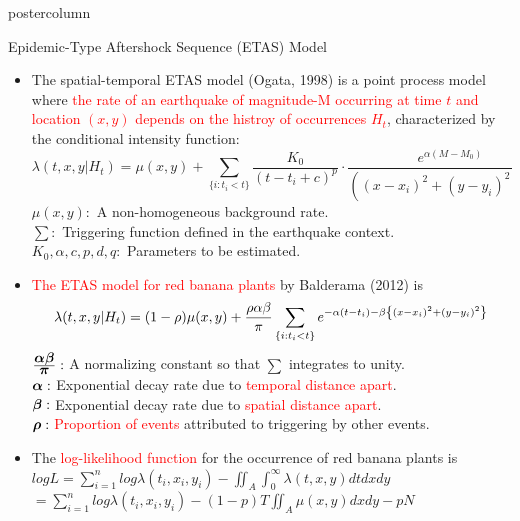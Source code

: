 \documentclass[final]{beamer}\usepackage[]{graphicx}\usepackage[]{color}
\newcommand{\bpi}{\mbox{\boldmath $\pi$} }
\newcommand{\balpha}{\mbox{\boldmath $\alpha$} }
\newcommand{\bbeta}{\mbox{\boldmath $\beta$} }
\newcommand{\brho}{\mbox{\boldmath $\rho$} }
\let\originalleft\left
\let\originalright\right
\renewcommand{\left}{\mathopen{}\mathclose\bgroup\originalleft}
\renewcommand{\right}{\aftergroup\egroup\originalright}
\newcommand{\red}{\textcolor{red}}
\begin{document}
{\begin{frame}
\begin{columns}
\begin{column}{.33\textwidth}
\begin{beamercolorbox}[center,wd=\textwidth]{postercolumn}
\begin{minipage}[T]{.97\textwidth}
{\begin{block}{Epidemic-Type Aftershock Sequence (ETAS) Model}
\begin{itemize}
	\item The spatial-temporal ETAS model (Ogata, 1998) is a point process model where \red{the rate of an earthquake of magnitude-M occurring at time $t$ and location $(x,y)$ depends on the histroy of occurrences $H_t$}, characterized by	the conditional intensity function:
	      $$\lambda(t,x,y|H_t)=\mu(x,y)+\sum \limits_{\{i:t_i<t\}}\frac{K_0}{(t-t_i+c)^p} \cdot  \frac{e^{\alpha(M-M_0)}}{((x-x_i)^2+(y-y_i)^2+d)^q}$$
	      $\mu(x, y):$ A non-homogeneous background rate.\\
	      $\sum:$ Triggering function defined in the earthquake context.\\
	      $K_0,\alpha, c, p, d, q:$ Parameters to be estimated.
	\vspace{0.5cm}
  \item \red{The ETAS model for red banana plants} by Balderama (2012) is
        $$\displaystyle{\lambda(t,x,y|H_t)=(1-\rho)\mu(x,y)+\frac{\rho\alpha\beta}{\pi}\sum \limits_{\left\{i:t_i<t\right\}}e^{-\alpha(t-t_i)-\beta\left\{(x-x_i)^2+(y-y_i)^2\right\}}}$$
        $\frac{\balpha\bbeta}{\bpi}:$ A normalizing constant so that $\sum$ integrates to unity.\\
        $\balpha:$ Exponential decay rate due to \red{temporal distance apart}.\\
        $\bbeta:$ Exponential decay rate due to \red{spatial distance apart}.\\
        $\brho:$ \red{Proportion of events} attributed to triggering by other events.
  \vspace{0.4cm}
  \item The \red{log-likelihood function} for the occurrence of red banana plants is \\
   \hspace{1cm} $\displaystyle{logL=\sum \limits_{i=1}^{n}log\lambda(t_i,x_i,y_i)-\iint_A \int_0^\infty \lambda(t,x,y)dtdxdy}$  \\
   \hspace{3.1cm} $\displaystyle{=\sum \limits_{i=1}^{n}log\lambda(t_i,x_i,y_i)-(1-p)T\iint_A\mu(x,y)dxdy-pN}$
   
   
\end{itemize}
  


\end{block}
\vfill

}
\end{minipage}
\end{beamercolorbox}
\end{column}
\end{columns}
\end{frame}}
\end{document}
